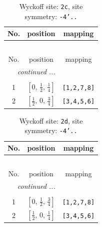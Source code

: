 \documentclass[fleqn,8pt]{jsarticle}
\begin{document}
\renewcommand{\arraystretch}{1.2}
\begin{longtable}{ccc}
\caption{Wyckoff site: {\tt 2c}, site symmetry: {\tt -4'..}}
 \\
 \hline \hline
No. & position & mapping \\ \hline \endfirsthead

\multicolumn{2}{l}{\tablename\ \thetable{}} \\
 \hline \hline
No. & position & mapping \\ \hline \endhead

 \hline \hline
\multicolumn{2}{r}{\footnotesize\it continued ...} \\ \endfoot

 \hline \hline
\multicolumn{2}{r}{} \\ \endlastfoot

1 & $\left[ 0,\, \frac{1}{2},\, \frac{1}{4} \right]$ & {\tt [1,2,7,8]} \\ \hline
2 & $\left[ \frac{1}{2},\, 0,\, \frac{3}{4} \right]$ & {\tt [3,4,5,6]} \\
\end{longtable}
\renewcommand{\arraystretch}{1.2}
\begin{longtable}{ccc}
\caption{Wyckoff site: {\tt 2d}, site symmetry: {\tt -4'..}}
 \\
 \hline \hline
No. & position & mapping \\ \hline \endfirsthead

\multicolumn{2}{l}{\tablename\ \thetable{}} \\
 \hline \hline
No. & position & mapping \\ \hline \endhead

 \hline \hline
\multicolumn{2}{r}{\footnotesize\it continued ...} \\ \endfoot

 \hline \hline
\multicolumn{2}{r}{} \\ \endlastfoot

1 & $\left[ 0,\, \frac{1}{2},\, \frac{3}{4} \right]$ & {\tt [1,2,7,8]} \\ \hline
2 & $\left[ \frac{1}{2},\, 0,\, \frac{1}{4} \right]$ & {\tt [3,4,5,6]} \\
\end{longtable}
\renewcommand{\arraystretch}{1.2}
\end{document}
